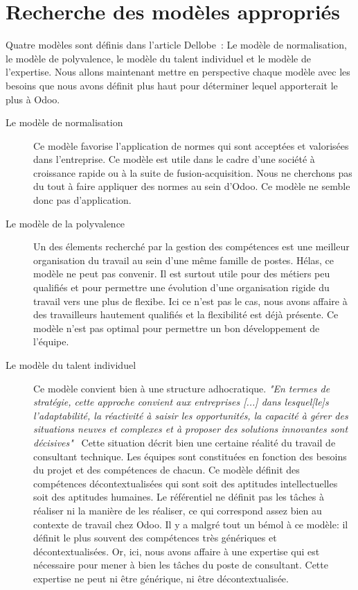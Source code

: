\section{Recherche des modèles appropriés}
Quatre modèles sont définis dans l'article Dellobe~\citep[pp.39-49]{delobbe}: Le modèle de normalisation, le modèle de polyvalence, le modèle du talent individuel et le modèle de l'expertise. Nous allons maintenant mettre en perspective chaque modèle avec les besoins que nous avons définit plus haut pour déterminer lequel apporterait le plus à Odoo.
\begin{description}
  \item[Le modèle de normalisation]
  Ce modèle favorise l'application de normes qui sont acceptées et valorisées dans l'entreprise. Ce modèle est utile dans le cadre d'une société à croissance rapide ou à la suite de fusion-acquisition. Nous ne cherchons pas du tout à faire appliquer des normes au sein d'Odoo. Ce modèle ne semble donc pas d'application. 
  \item[Le modèle de la polyvalence]
  Un des élements recherché par la gestion des compétences est une meilleur organisation du travail au sein d'une même famille de postes. Hélas, ce modèle ne peut pas convenir. Il est surtout utile pour des métiers peu qualifiés et pour permettre une évolution d'une organisation rigide du travail vers une plus de flexibe. Ici ce n'est pas le cas, nous avons affaire à des travailleurs hautement qualifiés et la flexibilité est déjà présente. Ce modèle n'est pas optimal pour permettre un bon développement de l'équipe. 
  \item[Le modèle du talent individuel]
  Ce modèle convient bien à une structure adhocratique. \textit{"En termes de stratégie, cette approche convient aux entreprises [...] dans lesquel[le]s l'adaptabilité, la réactivité à saisir les opportunités, la capacité à gérer des situations neuves et complexes et à proposer des solutions innovantes sont décisives"}~\citep[pp.44]{delobbe} Cette situation décrit bien une certaine réalité du travail de consultant technique. Les équipes sont constituées en fonction des besoins du projet et des compétences de chacun. Ce modèle définit des compétences décontextualisées qui sont soit des aptitudes intellectuelles soit des aptitudes humaines. Le référentiel ne définit pas les tâches à réaliser ni la manière de les réaliser, ce qui correspond assez bien au contexte de travail chez Odoo. Il y a malgré tout un bémol à ce modèle: il définit le plus souvent des compétences très génériques et décontextualisées. Or, ici, nous avons affaire à une expertise qui est nécessaire pour mener à bien les tâches du poste de consultant. Cette expertise ne peut ni être générique, ni être décontextualisée. 

\end{description}
